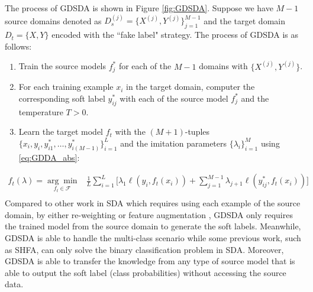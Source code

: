 The process of GDSDA is shown in Figure \ref{fig:GDSDA}. Suppose we have $M-1$ source domains denoted as $D_s^{(j)}=\{X^{(j)},Y^{(j)}\}_{j=1}^{M-1}$ and the target domain $D_t=\{X,Y\}$ encoded with the ``fake label" strategy. The process of GDSDA is as follows:
\begin{enumerate}
    \item Train the source models $f^*_j$ for each of the $M-1$ domains with $\{X^{(j)},Y^{(j)}\}$.
    \item For each training example $x_i$ in the target domain, computer the corresponding soft label $y^*_{ij}$ with each of the source model $f^*_j$ and the temperature $T>0$.
    \item Learn the target model $f_t$ with the $(M+1)$-tuples $\{x_i,y_i,y^*_{i1},\dots,y^*_{i(M-1)}\}_{i=1}^L$ and the imitation parameters $\{\lambda_i\}^M_{i=1}$ using \eqref{eq:GDDA_abs}:
\end{enumerate} 
\begin{equation}\label{eq:GDDA_abs}
\begin{aligned}
f_t(\lambda)=\underset{f_t \in \mathcal{F}}{\arg \min}&\frac{1}{L}\sum_{i=1}^{L}\bigg[\lambda_1\ell\left(y_i,f_t(x_i)\right)+\sum_{j=1}^{M-1}\lambda_{j+1}\ell\left(y^*_{ij},f_t(x_i)\right)\bigg]\qquad\\
\end{aligned}
\end{equation}
Compared to other work in SDA which requires using each example of the source domain, by either re-weighting \cite{Donahue_2013_CVPR,duan2012visual} or feature augmentation \cite{daume2010frustratingly}, GDSDA only requires the trained model from the source domain to generate the soft labels. 
Meanwhile, GDSDA is able to handle the multi-class scenario while some previous work, such as SHFA\cite{duan2012learning}, can only solve the binary classification problem in SDA. Moreover, GDSDA is able to transfer the knowledge from any type of source model that is able to output the soft label (class probabilities) without accessing the source data.

